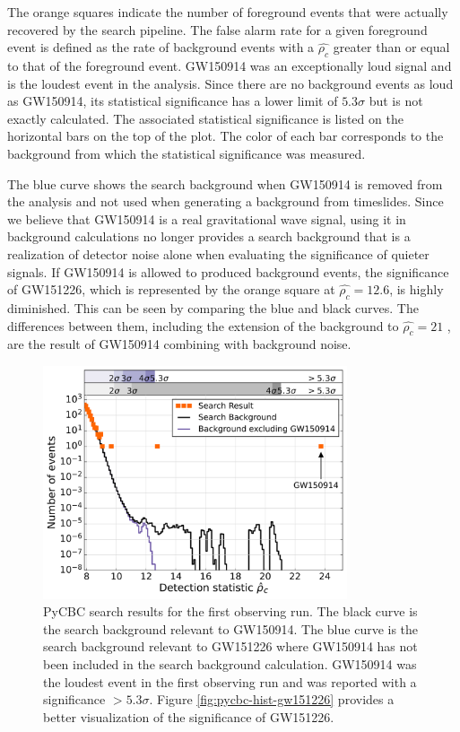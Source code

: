 The orange squares indicate the 
number of foreground events that were actually recovered by the search 
pipeline. The false alarm rate for a given foreground 
event is defined as the rate of background events with a $\hat{\rho_c}$ 
greater than or equal to that of the foreground event. GW150914 
was an exceptionally loud signal and is the loudest event in the 
analysis. Since there are no background events as loud as GW150914, 
its statistical significance has a lower limit of $5.3\sigma$ 
but is not exactly calculated. The associated statistical significance 
is listed on the horizontal bars on the top of the plot. The color 
of each bar corresponds to the background from which the statistical 
significance was measured.  

The blue curve shows the search background when GW150914 is removed 
from the analysis and not used when generating a background from 
timeslides. Since we believe that GW150914 is a real gravitational wave 
signal, using it in background calculations no longer provides a 
search background that is a realization of detector noise alone 
when evaluating the significance of quieter signals. 
If GW150914 is allowed to produced background events, the 
significance of GW151226, which is represented by the orange square at 
$\hat{\rho_c} = 12.6$, is highly diminished. This can be seen by comparing 
the blue and black curves. The differences between them, including the 
extension of the background to $\hat{\rho_c} = 21$ , are the result 
of GW150914 combining with background noise.

\begin{figure}[ht!]%
\includegraphics[width=0.8\textwidth]{figures/O1/pycbc_hist_GW150914}
\caption[PyCBC result histograms for GW150914]{PyCBC search results for %
         the first observing run. The black curve is the search background %
         relevant to GW150914. The blue curve is the search background %
         relevant to GW151226 where GW150914 has not been included in the %
         search background calculation. GW150914 was the loudest event in %
         the first observing run and was reported with a significance %
         $> 5.3\sigma$. Figure \ref{fig:pycbc-hist-gw151226} provides %
         a better visualization of the significance of GW151226.}
\label{fig:pycbc-hist-gw150914}
\end{figure}

